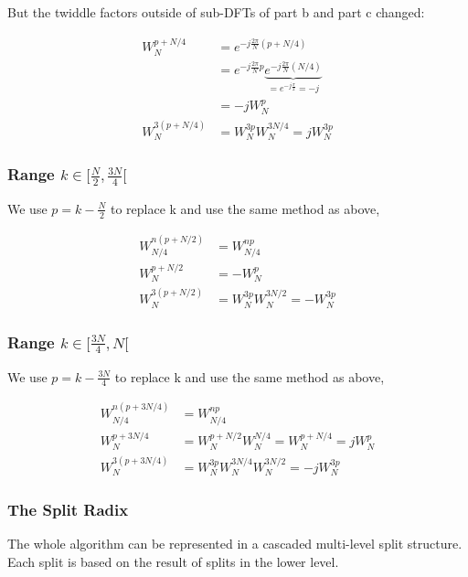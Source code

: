 \documentclass[a4paper]{report}
\begin{document}
	But the twiddle factors outside of sub-DFTs of part b and part c changed:

	\[\begin{split}
	W_N^{p+N/4} & = e^{-j\frac{2\pi}{N}(p+N/4)} \\
				& = e^{-j\frac{2\pi}{N}p} \underbrace{e^{-j\frac{2\pi}{N}(N/4)}}_{= e^{-j\frac{\pi}{2}} = -j} \\
				& = -j W_{N}^p \\
 W_N^{3(p+N/4)} & = W_N^{3p} W_N^{3N/4} = j W_N^{3p}
	\end{split}\]

\subsubsection{Range $k \in [\frac{N}{2}, \frac{3N}{4}[$} \indent

	We use $p = k - \frac{N}{2}$ to replace k and use the same method as above,
	
	\[\begin{split}
	W_{N/4}^{n(p+N/2)} & = W_{N/4}^{np} \\
	       W_N^{p+N/2} & = -W_N^p \\
	    W_N^{3(p+N/2)} & = W_N^{3p} W_N^{3N/2} = -W_N^{3p}
	\end{split}\]
	
\subsubsection{Range $k \in [\frac{3N}{4}, N[$} \indent

	We use $p = k - \frac{3N}{4}$ to replace k and use the same method as above,
	
	\[\begin{split}
	W_{N/4}^{n(p+3N/4)} & = W_{N/4}^{np} \\
	       W_N^{p+3N/4} & = W_N^{p+N/2} W_N^{N/4} = W_N^{p+N/4} = j W_{N}^p\\
	    W_N^{3(p+3N/4)} & = W_N^{3p} W_N^{3N/4} W_N^{3N/2} = -j W_N^{3p}
	\end{split}\]
	
\subsubsection{The Split Radix} \indent

	The whole algorithm can be represented in a cascaded multi-level split structure. Each split is based on the result of splits in the lower level.
	
	\bigskip
	
\end{document}
